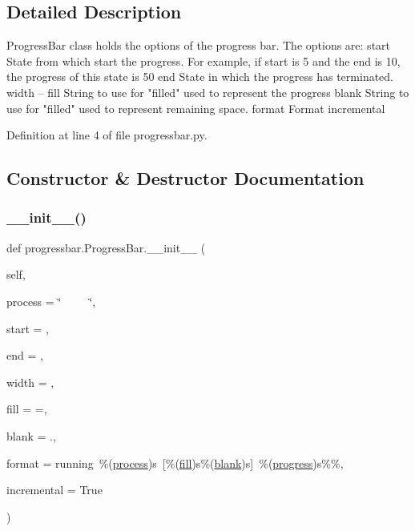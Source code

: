 \subsection{Detailed Description}
\begin{DoxyVerb}ProgressBar class holds the options of the progress bar.
The options are:
    start   State from which start the progress. For example, if start is
            5 and the end is 10, the progress of this state is 50%
    end     State in which the progress has terminated.
    width   --
    fill    String to use for "filled" used to represent the progress
    blank   String to use for "filled" used to represent remaining space.
    format  Format
    incremental
\end{DoxyVerb}
 

Definition at line 4 of file progressbar.\+py.



\subsection{Constructor \& Destructor Documentation}
\mbox{\label{classprogressbar_1_1ProgressBar_ad3722b896ddbe5ea96abe5604ac84475}} 
\subsubsection{\texorpdfstring{\+\_\+\+\_\+init\+\_\+\+\_\+()}{\_\_init\_\_()}}
{\footnotesize\ttfamily def progressbar.\+Progress\+Bar.\+\_\+\+\_\+init\+\_\+\+\_\+ (\begin{DoxyParamCaption}\item[{}]{self,  }\item[{}]{process = {\ttfamily \char`\"{}~~~~~\char`\"{}},  }\item[{}]{start = {},  }\item[{}]{end = {},  }\item[{}]{width = {},  }\item[{}]{fill = {\ttfamily \textquotesingle{}=\textquotesingle{}},  }\item[{}]{blank = {\ttfamily \textquotesingle{}.\textquotesingle{}},  }\item[{}]{format = {\ttfamily \textquotesingle{}running~\%(\hyperlink{classprogressbar_1_1ProgressBar_a28ce54371f3a84172049c0520726d2aa}{process})s~\mbox{[}\%(\hyperlink{classprogressbar_1_1ProgressBar_a6b11796a20118f92eb59abbccf626d23}{fill})s\%(\hyperlink{classprogressbar_1_1ProgressBar_a0bfce2d34f0a8f034748d77cc5140bc5}{blank})s\mbox{]}~\%(\hyperlink{classprogressbar_1_1ProgressBar_a3adc96f42e6891bcd2885c9ef29767f3}{progress})s\%\%\textquotesingle{}},  }\item[{}]{incremental = {\ttfamily True} }\end{DoxyParamCaption})}



